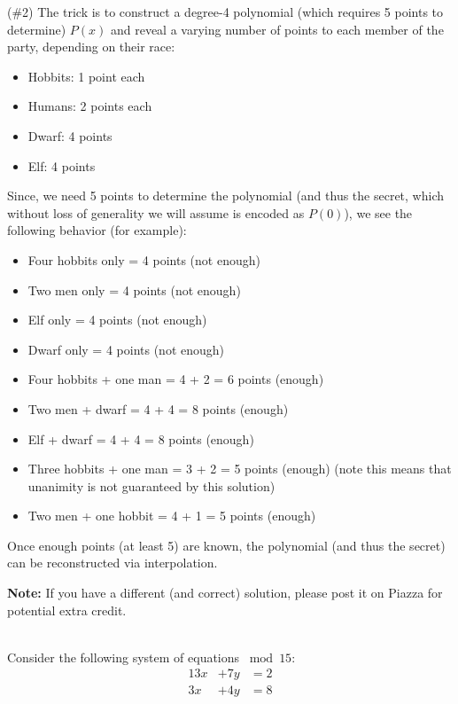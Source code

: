 \documentclass[]{article}
\renewcommand{\answer}[1]{{\color{mydarkblue}\textbf{}#1}}
\begin{document}
\begin{qunlist}
{{\answer (\#2) The trick is to construct a degree-4 polynomial (which requires 5 points to determine) $P(x)$ and reveal a varying number of points to each member of the party, depending on their race:

\begin{itemize}
	\item Hobbits: 1 point each
	\item Humans: 2 points each
	\item Dwarf: 4 points
	\item Elf: 4 points
\end{itemize}

Since, we need 5 points to determine the polynomial (and thus the secret, which without loss of generality we will assume is encoded as $P(0)$), we see the following behavior (for example):
\begin{itemize}
	\item Four hobbits only = 4 points (not enough)
	\item Two men only = 4 points (not enough)
	\item Elf only = 4 points (not enough)
	\item Dwarf only = 4 points (not enough)
	\item Four hobbits + one man = 4 + 2 = 6 points (enough)
	\item Two men + dwarf = 4 + 4 = 8 points (enough)
	\item Elf + dwarf = 4 + 4 = 8 points (enough)
	\item Three hobbits + one man = 3 + 2 = 5 points (enough) (note this means that unanimity is not guaranteed by this solution)
	\item Two men + one hobbit = 4 + 1 = 5 points (enough)
\end{itemize}

Once enough points (at least 5) are known, the polynomial (and thus the secret) can be reconstructed via interpolation.

\textbf{Note:} If you have a different (and correct) solution, please post it on Piazza for potential extra credit.

}}\fi



\\ %
Consider the following system of equations $\bmod{15}$:
\begin{align*}
13x &+ 7y &= 2 \\
3x &+ 4y &= 8
\end{align*}


\end{qunlist}
\end{document}
